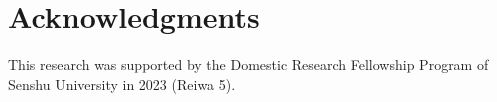\section{Acknowledgments}\label{acknowledgments}

This research was supported by the Domestic Research Fellowship Program of Senshu University in 2023 (Reiwa 5).



\address{%
Koji Kosugi\\
Senshu University\\%
School of Human Sciences\\ 2-1-1 Higashi-mita, Tama-ku, Kawasaki, Kanagawa 214-8580, Japan\\
%
\url{https://kosugitti.github.io/kosugitti10/}\\%
\textit{ORCiD: \href{https://orcid.org/0000-0001-5816-0099}{0000-0001-5816-0099}}\\%
\href{mailto:kosugi@psy.senshu-u.ac.jp}{\nolinkurl{kosugi@psy.senshu-u.ac.jp}}%
}

\address{%
Kojiro Shojima\\
The National Center for University Entrance Examinations\\%
Research Division\\ 2-19-23, Komaba, Meguro-ku, Tokyo, Japan\\
%
\url{http://sh0j1ma.stars.ne.jp/tde/index.htm}\\%
%
\href{mailto:shojima@rd.dnc.ac.jp}{\nolinkurl{shojima@rd.dnc.ac.jp}}%
}
